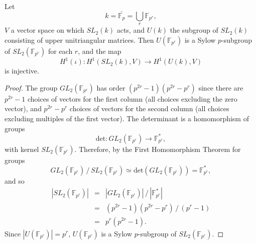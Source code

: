 \begin{example}
	Let
	\begin{displaymath}
		k = \bar{\mathbb{F}_p} = \bigcup_r \mathbb{F}_{p^r},
	\end{displaymath}
	$V$ a vector space on which $SL_2(k)$ acts, and $U(k)$ the subgroup of $SL_2(k)$ consisting of upper unitriangular matrices. Then $U(\mathbb{F}_{p^r})$ is a Sylow $p$-subgroup of $SL_2(\mathbb{F}_{p^r})$ for each $r$, and the map
	\begin{displaymath}
		H^1(\iota): H^1(SL_2(k), V) \rightarrow H^1(U(k), V)
	\end{displaymath}
	is injective.
\label{eg:sl2ab}
\end{example}
\begin{proof}
	The group $GL_2(\mathbb{F}_{p^r})$ has order $(p^{2r} - 1)(p^{2r} - p^r)$ since there are $p^{2r} - 1$ choices of vectors for the first column (all choices excluding the zero vector), and $p^{2r} - p^r$ choices of vectors for the second column (all choices excluding multiples of the first vector). The determinant is a homomorphism of groups
	\begin{displaymath}
		\mathrm{det}:GL_2(\mathbb{F}_{p^r}) \rightarrow \mathbb{F}^*_{p^r},
	\end{displaymath}
	with kernel $SL_2(\mathbb{F}_{p^r})$. Therefore, by the First Homomorphism Theorem for groups
	\begin{displaymath}
		GL_2(\mathbb{F}_{p^r})\,/\,SL_2(\mathbb{F}_{p^r}) \simeq \mathrm{det}(GL_2(\mathbb{F}_{p^r})) = \mathbb{F}^*_{p^r},
	\end{displaymath}
	and so
	\begin{eqnarray*}
		|SL_2(\mathbb{F}_{p^r})|
		&=& |GL_2(\mathbb{F}_{p^r})|\,/\,|\mathbb{F}^*_{p^r}|\\
		&=& (p^{2r} - 1)(p^{2r} - p^r)\,/\,(p^r - 1)\\
		&=& p^r(p^{2r} - 1).
	\end{eqnarray*}
	Since $|U(\mathbb{F}_{p^r})| = p^r$, $U(\mathbb{F}_{p^r})$ is a Sylow $p$-subgroup of $SL_2(\mathbb{F}_{p^r})$.
	

\end{proof}
